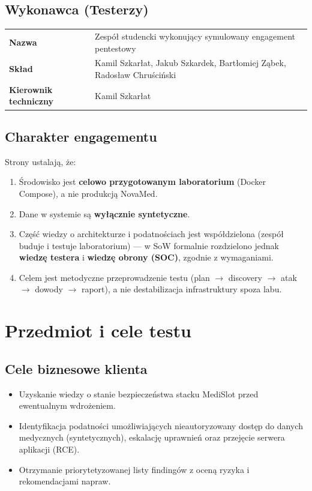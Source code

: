 \documentclass[11pt,a4paper]{article}
\begin{document}
\subsection{Wykonawca (Testerzy)}

\begin{tabularx}{\textwidth}{@{}>{\bfseries}l L@{}}
\toprule
Nazwa & Zespół studencki wykonujący symulowany engagement pentestowy \\
Skład & Kamil Szkarłat, Jakub Szkardek, Bartłomiej Ząbek, Radosław Chruściński \\
Kierownik techniczny & Kamil Szkarłat \\
\bottomrule
\end{tabularx}

\subsection{Charakter engagementu}

Strony ustalają, że:
\begin{enumerate}[leftmargin=*]
  \item Środowisko jest \textbf{celowo przygotowanym laboratorium} (Docker Compose), a nie produkcją NovaMed.
  \item Dane w systemie są \textbf{wyłącznie syntetyczne}.
  \item Część wiedzy o architekturze i podatnościach jest współdzielona (zespół buduje i testuje laboratorium) — w SoW formalnie rozdzielono jednak \textbf{wiedzę testera} i \textbf{wiedzę obrony (SOC)}, zgodnie z wymaganiami.
  \item Celem jest metodyczne przeprowadzenie testu (plan $\rightarrow$ discovery $\rightarrow$ atak $\rightarrow$ dowody $\rightarrow$ raport), a nie destabilizacja infrastruktury spoza labu.
\end{enumerate}

\section{Przedmiot i cele testu}

\subsection{Cele biznesowe klienta}
\begin{itemize}[leftmargin=*]
  \item Uzyskanie wiedzy o stanie bezpieczeństwa stacku MediSlot przed ewentualnym wdrożeniem.
  \item Identyfikacja podatności umożliwiających nieautoryzowany dostęp do danych medycznych (syntetycznych), eskalację uprawnień oraz przejęcie serwera aplikacji (RCE).
  \item Otrzymanie priorytetyzowanej listy findingów z oceną ryzyka i rekomendacjami napraw.
\end{itemize}
\end{document}
